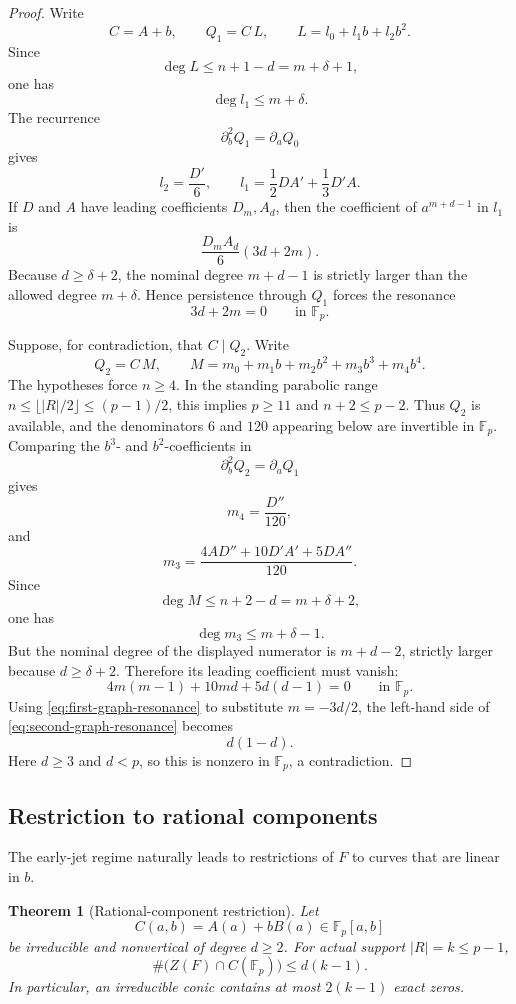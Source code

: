\documentclass[11pt]{article}
\newtheorem{theorem}{Theorem}[section]
\newcommand{\F}{\mathbb F}
\begin{document}
\begin{proof}
Write
\[
 C=A+b,\qquad Q_1=C\,L,
 \qquad
 L=l_0+l_1b+l_2b^2.
\]
Since
\[
 \deg L\le n+1-d=m+\delta+1,
\]
one has
\[
 \deg l_1\le m+\delta.
\]
The recurrence
\[
 \partial_b^2Q_1=\partial_aQ_0
\]
gives
\[
 l_2=\frac{D'}6,
 \qquad
 l_1=\frac12DA'+\frac13D'A.
\]
If \(D\) and \(A\) have leading coefficients \(D_m,A_d\), then the
coefficient of \(a^{m+d-1}\) in \(l_1\) is
\[
 \frac{D_mA_d}{6}(3d+2m).
\]
Because \(d\ge\delta+2\), the nominal degree \(m+d-1\) is strictly
larger than the allowed degree \(m+\delta\).  Hence persistence through
\(Q_1\) forces the resonance
\begin{equation}
 3d+2m=0
 \qquad\text{in }\F_p.
 \label{eq:first-graph-resonance}
\end{equation}

Suppose, for contradiction, that \(C\mid Q_2\).  Write
\[
 Q_2=C\,M,
 \qquad
 M=m_0+m_1b+m_2b^2+m_3b^3+m_4b^4.
\]
The hypotheses force \(n\ge4\).  In the standing parabolic range
\(n\le\lfloor |R|/2\rfloor\le(p-1)/2\), this implies \(p\ge11\) and
\(n+2\le p-2\).  Thus \(Q_2\) is available, and the denominators
\(6\) and \(120\) appearing below are invertible in \(\F_p\).
Comparing the \(b^3\)- and \(b^2\)-coefficients in
\[
 \partial_b^2Q_2=\partial_aQ_1
\]
gives
\[
 m_4=\frac{D''}{120},
\]
and
\[
 m_3=
 \frac{
 4AD''+10D'A'+5DA''
 }{120}.
\]
Since
\[
 \deg M\le n+2-d=m+\delta+2,
\]
one has
\[
 \deg m_3\le m+\delta-1.
\]
But the nominal degree of the displayed numerator is \(m+d-2\),
strictly larger because \(d\ge\delta+2\).  Therefore its leading
coefficient must vanish:
\begin{equation}
 4m(m-1)+10md+5d(d-1)=0
 \qquad\text{in }\F_p.
 \label{eq:second-graph-resonance}
\end{equation}
Using \eqref{eq:first-graph-resonance} to substitute
\(m=-3d/2\), the left-hand side of
\eqref{eq:second-graph-resonance} becomes
\[
 d(1-d).
\]
Here \(d\ge3\) and \(d<p\), so this is nonzero in \(\F_p\), a
contradiction.
\end{proof}

\subsection{Restriction to rational components}

The early-jet regime naturally leads to restrictions of $F$ to curves that are linear in $b$.

\begin{theorem}[Rational-component restriction]
\label{thm:rational-component-restriction}
Let
\[
 C(a,b)=A(a)+bB(a)\in\F_p[a,b]
\]
be irreducible and nonvertical of degree $d\ge2$.  For actual support $|R|=k\le p-1$,
\begin{equation}
 \boxed{\#\bigl(Z(F)\cap C(\F_p)\bigr)\le d(k-1).}
 \label{eq:rational-component-restriction}
\end{equation}
In particular, an irreducible conic contains at most $2(k-1)$ exact zeros.
\end{theorem}
\end{document}

